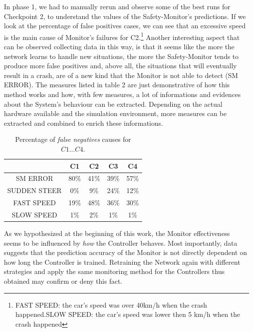 In phase 1, we had to manually rerun and observe some of the best runs for Checkpoint 2, to understand the values of the Safety-Monitor's predictions. If we look at the percentage of false positives cases, we can see that an excessive speed is the main cause of Monitor's failures for C2.\footnote{FAST SPEED: the car's speed was over 40km/h when the crash happened.\newline SLOW SPEED: the car's speed was lower then 5 km/h when the crash happened}
Another interesting aspect that can be observed collecting data in this way, is that it seems like the more the network learns to handle new situations, the more the Safety-Monitor tends to produce more false positives and, above all, the situations that will eventually result in a crash, are of a new kind that the Monitor is not able to detect (SM ERROR).\newline
The measures listed in table 2 are just demonstrative of how this method works and how, with few measures, a lot of informations and evidences about the System's behaviour can be extracted. Depending on the actual hardware available and the simulation environment, more measures can be extracted and combined to enrich these informations.\newline

\begin{table}[h!]
	\begin{center}
		\begin{tabular}{ |c|c|c|c|c| }
			\hline
			& C1 & C2 & C3 & C4 \\
			\hline
			SM ERROR & 80\% & 41\% & 39\% & 57\% \\
			\hline
			SUDDEN STEER & 0\% & 9\% & 24\% & 12\% \\
			\hline
			FAST SPEED & 19\% & 48\% & 36\% & 30\% \\
			\hline
			SLOW SPEED & 1\% & 2\% & 1\% & 1\% \\
			\hline
		\end{tabular}

	\caption{Percentage of \textsl{false negatives} causes for $C1\dots C4$.}
	\end{center}
\end{table}

As we hypothesized at the beginning of this work, the Monitor effectiveness seems to be influenced by \textsl{how} the Controller behaves. Most importantly, data suggests that the prediction accuracy of the Monitor is not directly dependent on how long the Controller is trained. Retraining the Network again with different strategies and apply the same monitoring method for the Controllers thus obtained may confirm or deny this fact.








